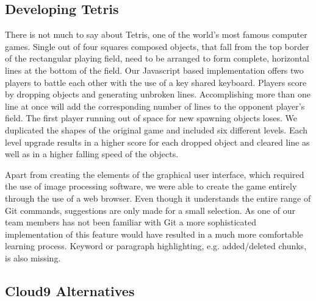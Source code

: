 \subsection{Developing Tetris}
There is not much to say about Tetris, one of the world's most famous computer games. Single out of four squares composed objects, that fall from the top border of the rectangular playing field, need to be arranged to form complete, horizontal lines at the bottom of the field. Our Javascript based implementation offers two players to battle each other with the use of a key shared keyboard. Players score by dropping objects and generating unbroken lines. Accomplishing more than one line at once will add the corresponding number of lines to the opponent player's field. The first player running out of space for new spawning objects loses. We duplicated the shapes of the original game and included six different levels. Each level upgrade results in a higher score for each dropped object and cleared line as well as in a higher falling speed of the objects.

Apart from creating the elements of the graphical user interface, which required the use of image processing software, we were able to create the game entirely through the use of a web browser. 
Even though it understands the entire range of Git commands, suggestions are only made for a small selection. As one of our team members has not been familiar with Git a more sophisticated implementation of this feature would have resulted in a much more comfortable learning process. Keyword or paragraph highlighting, e.g. added/deleted chunks, is also missing. 

\subsection{Cloud9 Alternatives}
